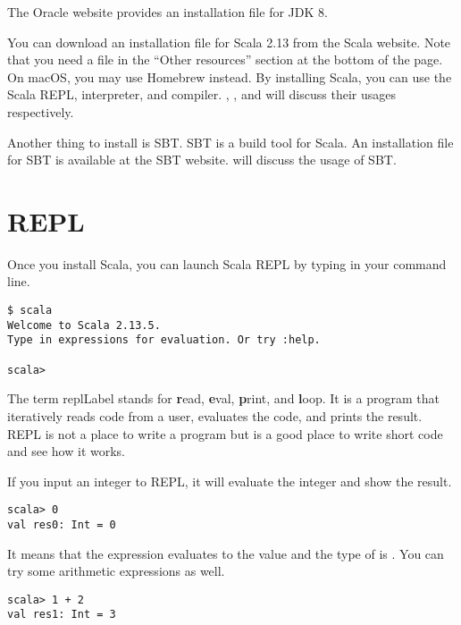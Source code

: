 The Oracle website
provides an installation file for JDK 8.

You can download an installation file for Scala 2.13 from the Scala
website. Note that you need a
file in the ``Other resources'' section at the bottom of the page.
On macOS, you may use Homebrew instead. By installing Scala, you can use the
Scala REPL, interpreter, and compiler. ,
, and  will discuss
their usages respectively.

Another thing to install is SBT. SBT is a build tool for Scala. An installation
file for SBT is available at the SBT
website.
 will discuss the usage of SBT.

\section{REPL}

Once you install Scala, you can launch Scala REPL by typing  in
your command line.

\begin{verbatim}
$ scala
Welcome to Scala 2.13.5.
Type in expressions for evaluation. Or try :help.

scala>
\end{verbatim}

The term \acrshort{replLabel} stands for \textbf{r}ead, \textbf{e}val, \textbf{p}rint, and
\textbf{l}oop.
It is a program that iteratively reads code from a user, evaluates the code,
and prints the result. REPL is not a place to write a program but is a good
place to write short code and see how it works.

If you input an integer to REPL, it will evaluate the integer and show the
result.

\begin{verbatim}
scala> 0
val res0: Int = 0
\end{verbatim}

It means that the expression  evaluates to the value  and the type of
 is .
You can try some arithmetic expressions as well.

\begin{verbatim}
scala> 1 + 2
val res1: Int = 3
\end{verbatim}

